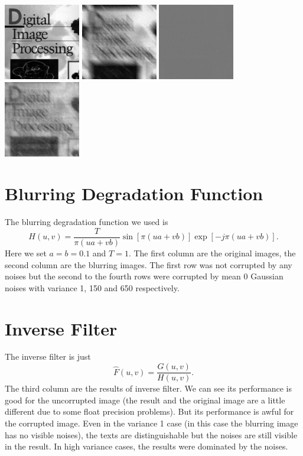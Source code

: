 \documentclass{article}
\begin{document}
\includegraphics[width=0.25\textwidth]{../data/book_cover.jpg}
\includegraphics[width=0.25\textwidth]{../data/blur_650_book_cover.jpg}
\includegraphics[width=0.25\textwidth]{../data/inverse_650_book_cover.jpg}
\includegraphics[width=0.25\textwidth]{../data/wiener_deconvolution_650_book_cover.jpg}

\section{Blurring Degradation Function}
The blurring degradation function we used is $$H(u,v)=\frac{T}{\pi(ua+vb)}\sin[\pi(ua+vb)]\exp[-j\pi(ua+vb)].$$ Here we set $a=b=0.1$ and $T=1$. The first column are the original images, the second column are the blurring images. The first row was not corrupted by any noises but the second to the fourth rows were corrupted by mean 0 Gaussian noises with variance 1, 150 and 650 respectively.

\section{Inverse Filter}
The inverse filter is just $$\hat{F}(u,v)=\frac{G(u,v)}{H(u,v)}.$$ The third column are the results of inverse filter. We can see its performance is good for the uncorrupted image (the result and the original image are a little different due to some float precision problems). But its performance is awful for the corrupted image. Even in the variance 1 case (in this case the blurring image has no visible noises), the texts are distinguishable but the noises are still visible in the result. In high variance cases, the results were dominated by the noises. 
\end{document}
